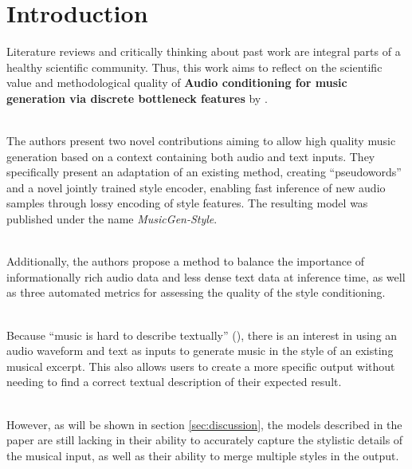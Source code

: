 \documentclass[a4paper,12pt,twoside]{article}
\begin{document}

\tableofcontents
\clearpage



\section{Introduction}

Literature reviews and critically thinking about past work are integral parts of a healthy scientific community.
Thus, this work aims to reflect on the scientific value and methodological quality of \textbf{Audio conditioning for music generation via discrete bottleneck features}  by  \cite{rouardAudioConditioningMusic2024}.\\ \

The authors present two novel contributions aiming to allow high quality music generation based on a context containing both audio and text inputs. They specifically present an adaptation of an existing method, creating ``pseudowords''
and a novel jointly trained style encoder, enabling fast inference of new audio samples through lossy encoding of style features. The resulting model was published under the name \textit{MusicGen-Style}.  \\ \

Additionally, the authors propose a method to balance the importance of informationally rich audio data and less dense text data at inference time, as well as three automated metrics for assessing the quality of the style conditioning. \\ \

Because ``music is hard to describe textually'' (\cite{rouardAudioConditioningMusic2024}), there is an interest in using an audio waveform and text as inputs to generate music in the style of an existing musical excerpt. This also allows users to create a more specific output without needing to find a correct textual description of their expected result. \\ \

However, as will be shown in section \ref{sec:discussion}, the models described in the paper are still lacking in their ability to accurately capture the stylistic details of the musical input, as well as their ability to merge multiple styles in the output. \\ \
\end{document}
